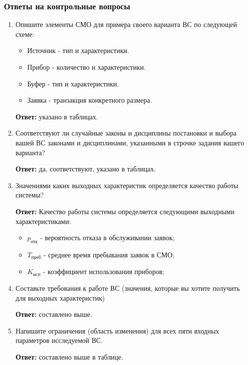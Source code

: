 \documentclass[a4paper, 14pt]{article}
\begin{document}
\subsubsection{Ответы на контрольные вопросы}

\begin{enumerate}
	\item Опишите элементы СМО для примера своего варианта ВС по следующей схеме:
	      \begin{itemize}
		      \item Источник - тип и характеристики.
		      \item Прибор - количество и характеристики.
		      \item Буфер - тип и характеристики.
		      \item Заявка - транзакция конкретного размера.
	      \end{itemize}

	      \textbf{Ответ:} указано в таблицах.
	\item Соответствуют ли случайные законы и дисциплины постановки и выбора вашей ВС законами и дисциплинами, указанными в строчке задания вашего варианта?

	      \textbf{Ответ:} да, соответствуют, указано в таблицах.
	\item Значениями каких выходных характеристик определяется качество работы системы?

	      \textbf{Ответ:}
	      Качество работы системы определяется следующими выходными характеристиками:

	      \begin{itemize}
		      \item $p_\text{отк}$ - вероятность отказа в обслуживании заявок;
		      \item $T_\text{преб}$ - среднее время пребывания заявок в СМО;
		      \item $K_\text{исп}$ - коэффициент использования приборов;
	      \end{itemize}
	\item Составьте требования к работе ВС (значения, которые вы хотите получить для выходных характеристик)

	      \textbf{Ответ:} составлено выше.
	\item Напишите ограничения (область изменения) для всех пяти входных параметров исследуемой ВС.

	      \textbf{Ответ:} составлено выше в таблице.
\end{enumerate}
\end{document}
